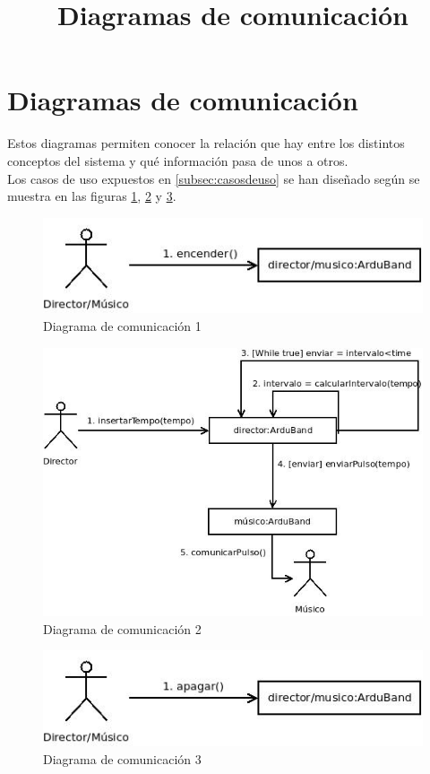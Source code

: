 \section{Diagramas de comunicación}
\title{Diagramas de comunicación}

Estos diagramas permiten conocer la relación que hay entre los distintos
conceptos del sistema y qué información pasa de unos a otros.\\

Los casos de uso expuestos en \ref{subsec:casosdeuso} se han diseñado según
se muestra en las figuras \ref{fig:comunicacion1},  \ref{fig:comunicacion2} y
\ref{fig:comunicacion3}.\\

\begin{figure}[htb]
\centering
\includegraphics[width=1\textwidth]{./imagenes/comunicacion1}
\caption{Diagrama de comunicación 1} \label{fig:comunicacion1}
\end{figure}

\begin{figure}[htb]
\centering
\includegraphics[width=1\textwidth]{./imagenes/comunicacion2}
\caption{Diagrama de comunicación 2} \label{fig:comunicacion2}
\end{figure}

\begin{figure}[htb]
\centering
\includegraphics[width=1\textwidth]{./imagenes/comunicacion3}
\caption{Diagrama de comunicación 3} \label{fig:comunicacion3}
\end{figure}

